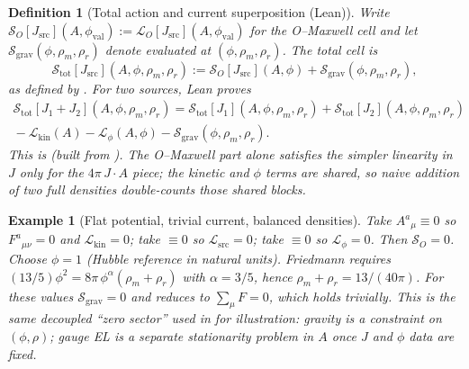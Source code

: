 \documentclass[11pt]{amsart}
\newtheorem{definition}[theorem]{Definition}
\newtheorem{example}[theorem]{Example}
\begin{document}
\begin{definition}[Total action and current superposition (Lean)]
\label{def:total}
Write \(\mathcal{S}_O[J_{\mathrm{src}}](A,\phi_{\mathrm{val}}):=\mathcal{L}_O[J_{\mathrm{src}}](A,\phi_{\mathrm{val}})\) for the O--Maxwell cell and let \(\mathcal{S}_{\mathrm{grav}}(\phi,\rho_m,\rho_r)\) denote  evaluated at \((\phi,\rho_m,\rho_r)\). The total cell is
\[
\mathcal{S}_{\mathrm{tot}}[J_{\mathrm{src}}](A,\phi,\rho_m,\rho_r)
:= \mathcal{S}_O[J_{\mathrm{src}}](A,\phi) + \mathcal{S}_{\mathrm{grav}}(\phi,\rho_m,\rho_r),
\]
as defined by .
For two sources, Lean proves
\begin{multline}
\label{eq:superposition-correction}
\mathcal{S}_{\mathrm{tot}}[J_1+J_2](A,\phi,\rho_m,\rho_r)
= \mathcal{S}_{\mathrm{tot}}[J_1](A,\phi,\rho_m,\rho_r)
+ \mathcal{S}_{\mathrm{tot}}[J_2](A,\phi,\rho_m,\rho_r) \\
{}- \mathcal{L}_{\mathrm{kin}}(A) - \mathcal{L}_\phi(A,\phi) - \mathcal{S}_{\mathrm{grav}}(\phi,\rho_m,\rho_r).
\end{multline}
This is  (built from ). The O--Maxwell part alone satisfies the simpler linearity in \(J\) only for the \(4\pi\,J\!\cdot\!A\) piece; the kinetic and \(\phi\) terms are shared, so naive addition of two full densities double-counts those shared blocks.
\end{definition}

\begin{example}[Flat potential, trivial current, balanced densities]
\label{ex:simultaneous}
Take \(A^a{}_\mu\equiv 0\) so \(F^a{}_{\mu\nu}=0\) and \(\mathcal{L}_{\mathrm{kin}}=0\); take \(\equiv 0\) so \(\mathcal{L}_{\mathrm{src}}=0\); take \(\equiv 0\) so \(\mathcal{L}_\phi=0\). Then \(\mathcal{S}_O=0\). Choose \(\phi=1\) (Hubble reference in natural units). Friedmann requires \((13/5)\phi^2 = 8\pi\,\phi^{\alpha}(\rho_m+\rho_r)\) with \(\alpha=3/5\), hence \(\rho_m+\rho_r = 13/(40\pi)\). For these values \(\mathcal{S}_{\mathrm{grav}}=0\) and  reduces to \(\sum_\mu F=0\), which holds trivially. This is the same decoupled ``zero sector'' used in  for illustration: gravity is a constraint on \((\phi,\rho)\); gauge EL is a separate stationarity problem in \(A\) once \(J\) and \(\phi\) data are fixed.
\end{example}
\end{document}
